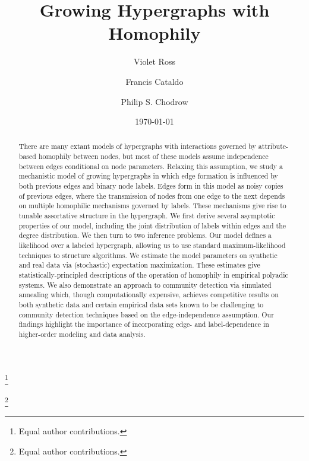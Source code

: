 \documentclass[aps,pre,reprint,superscriptaddress,nofootinbib]{revtex4-2}
\begin{document}
\title{Growing Hypergraphs with Homophily}
\author{Violet Ross}
\thanks{Equal author contributions.}

\author{Francis Cataldo}
\thanks{Equal author contributions.}

\author{Philip S. Chodrow}


\date{\today}
\begin{abstract}
    There are many extant models of hypergraphs with interactions governed by attribute-based homophily between nodes, but most of these models assume independence between edges conditional on node parameters. 
    Relaxing this assumption, we study a mechanistic model of growing hypergraphs in which edge formation is influenced by both previous edges and binary node labels. 
    Edges form in this model as noisy copies of previous edges, where the transmission of nodes from one edge to the next depends on multiple homophilic mechanisms governed by labels.
    These mechanisms give rise to tunable assortative structure in the hypergraph. 
    We first derive several asymptotic properties of our model, including the joint distribution of labels within edges and the degree distribution.
    We then turn to two inference problems. 
    Our model defines a likelihood over a labeled hypergraph, allowing us to use standard maximum-likelihood techniques to structure algorithms. 
    We estimate the model parameters on synthetic and real data via (stochastic) expectation maximization. 
    These estimates give statistically-principled descriptions of the operation of homophily in empirical polyadic systems. 
    We also demonstrate an approach to community detection via simulated annealing which, though computationally expensive, achieves competitive results on both synthetic data and certain empirical data sets known to be challenging to community detection techniques based on the edge-independence assumption. 
    Our findings highlight the importance of incorporating edge- and label-dependence in higher-order modeling and data analysis. 
\end{abstract}

\maketitle
\end{document}
